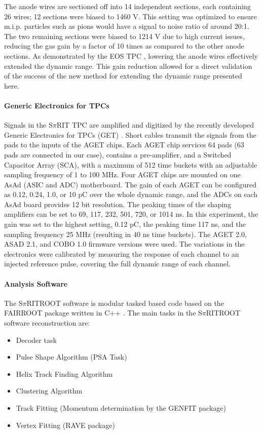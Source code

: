 \documentclass[review]{elsarticle}
\begin{document}
The anode wires are sectioned off into 14 independent sections, each containing 26 wires; 12 sections were biased to 1460 V. This setting was optimized to ensure m.i.p. particles such as pions would have a signal to noise ratio of around 20:1. The two remaining sections were biased to 1214 V due to high current issues, reducing the gas gain by a factor of 10 times as compared to the other anode sections. As demonstrated by the EOS TPC \citep{eos}, lowering the anode wires effectively extended the dynamic range.  This gain reduction allowed for a direct validation of the success of the new method for extending the dynamic range presented here. 

\paragraph{Generic Electronics for TPCs}
Signals in the S$\pi$RIT TPC are amplified and digitized by the recently developed Generic Electronics for TPCs (GET) \cite{get}.  Short cables transmit the signals from the pads to the inputs of the AGET chips. Each AGET chip services 64 pads (63 pads are connected in our case), contains a pre-amplifier, and a Switched Capacitor Array (SCA), with a maximum of 512 time buckets with an adjustable sampling frequency of 1 to 100 MHz. Four AGET chips are mounted on one AsAd (ASIC and ADC) motherboard. The gain of each AGET can be configured as 0.12, 0.24, 1.0, or 10 pC over the whole dynamic range, and the ADCs on each AsAd board provides 12 bit resolution. The peaking times of the shaping amplifiers can be set to 69, 117, 232, 501, 720, or 1014 ns. In this experiment, the gain was set to the highest setting, 0.12 pC, the peaking time 117 ns, and the sampling frequency 25 MHz (resulting in 40 ns time buckets). The AGET 2.0, ASAD 2.1, and COBO 1.0 firmware versions were used. The variations in the electronics were calibrated by measuring the response of each channel to an injected reference pulse, covering the full dynamic range of each channel. 

\paragraph{Analysis Software}
The S$\pi$RITROOT software is modular tasked based code based on the FAIRROOT package written in C++ \cite{fairroot}. The main tasks in the S$\pi$RITROOT software reconstruction are:
\begin{itemize}
  \item Decoder task
  \item Pulse Shape Algorithm (PSA Task)
  \item Helix Track Finding Algorithm
  \item Clustering Algorithm
  \item Track Fitting (Momentum determination by the GENFIT package)
  \item Vertex Fitting (RAVE package)
\end{itemize}
\end{document}
